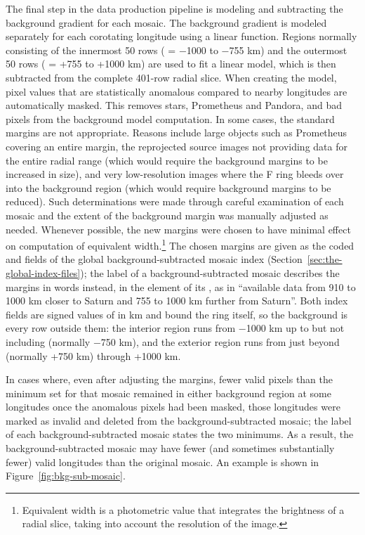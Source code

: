 The final step in the data production pipeline is modeling and subtracting the background gradient for each mosaic. The background gradient is modeled separately for each corotating longitude using a linear function. Regions normally consisting of the innermost 50 rows (\dr{} = −1000 to −755 km) and the outermost 50 rows (\dr{} = +755 to +1000 km) are used to fit a linear model, which is then subtracted from the complete 401-row radial slice. When creating the model, pixel values that are statistically anomalous compared to nearby longitudes are automatically masked. This removes stars, Prometheus and Pandora, and bad pixels from the background model computation. In some cases, the standard margins are not appropriate. Reasons include large objects such as Prometheus covering an entire margin, the reprojected source images not providing data for the entire radial range (which would require the background margins to be increased in size), and very low-resolution images where the F ring bleeds over into the background region (which would require background margins to be reduced). Such determinations were made through careful examination of each mosaic and the extent of the background margin was manually adjusted as needed. Whenever possible, the new margins were chosen to have minimal effect on computation of equivalent width.\footnote{Equivalent width is a photometric value that integrates the brightness of a radial slice, taking into account the resolution of the image.} The chosen margins are given as the coded  and  fields of the global background-subtracted mosaic index (Section~\ref{sec:the-global-index-files}); the label of a background-subtracted mosaic describes the margins in words instead, in the  element of its , as in “available data from 910 to 1000 km closer to Saturn and 755 to 1000 km further from Saturn”. Both index fields are signed values of \dr{} in km and bound the ring itself, so the background is every row outside them: the interior region runs from −1000 km up to but not including  (normally −750 km), and the exterior region runs from just beyond  (normally +750 km) through +1000 km.

In cases where, even after adjusting the margins, fewer valid pixels than the minimum set for that mosaic remained in either background region at some longitudes once the anomalous pixels had been masked, those longitudes were marked as invalid and deleted from the background-subtracted mosaic; the label of each background-subtracted mosaic states the two minimums. As a result, the background-subtracted mosaic may have fewer (and sometimes substantially fewer) valid longitudes than the original mosaic. An example is shown in Figure~\ref{fig:bkg-sub-mosaic}.

